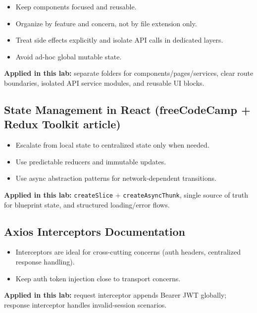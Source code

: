 \documentclass[10pt,a4paper,twocolumn]{article}
\begin{document}
\begin{itemize}
  \item Keep components focused and reusable.
  \item Organize by feature and concern, not by file extension only.
  \item Treat side effects explicitly and isolate API calls in dedicated layers.
  \item Avoid ad-hoc global mutable state.
\end{itemize}

\textbf{Applied in this lab:} separate folders for components/pages/services,
clear route boundaries, isolated API service modules, and reusable UI blocks.

\subsection{State Management in React (freeCodeCamp + Redux Toolkit article)}

\begin{itemize}
  \item Escalate from local state to centralized state only when needed.
  \item Use predictable reducers and immutable updates.
  \item Use async abstraction patterns for network-dependent transitions.
\end{itemize}

\textbf{Applied in this lab:} \texttt{createSlice} + \texttt{createAsyncThunk},
single source of truth for blueprint state, and structured loading/error flows.

\subsection{Axios Interceptors Documentation}

\begin{itemize}
  \item Interceptors are ideal for cross-cutting concerns (auth headers,
	  centralized response handling).
  \item Keep auth token injection close to transport concerns.
\end{itemize}

\textbf{Applied in this lab:} request interceptor appends Bearer JWT globally;
response interceptor handles invalid-session scenarios.

\end{document}
